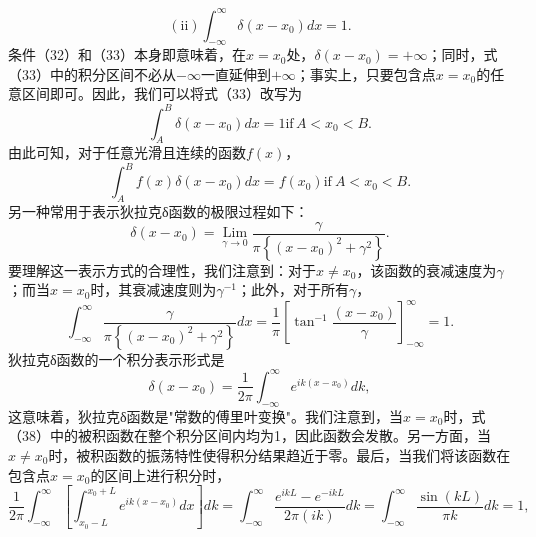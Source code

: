 \begin{equation}\tag{17.2.36}\label{eq:17.2.36}
( \mathrm { i i } )  \int _ { - \infty } ^{\infty} \delta ( x - x _ { 0 } ) d x = 1 .
\end{equation}
条件（32）和（33）本身即意味着，在\(x = x_0\)处，\(\delta(x - x_0) = +\infty\)；同时，式（33）中的积分区间不必从\(-\infty\)一直延伸到\(+\infty\)；事实上，只要包含点\(x = x_0\)的任意区间即可。因此，我们可以将式（33）改写为
\begin{equation}\tag{17.2.37}\label{eq:17.2.37}
\int _ { A } ^{B} \delta ( x - x _ { 0 } ) d x = 1  \mathrm { i f } \, A < x _ { 0 } < B .
\end{equation}
由此可知，对于任意光滑且连续的函数\(f(x)\)，
\begin{equation}\tag{17.2.38}\label{eq:17.2.38}
\int _ { A } ^{B} f ( x ) \delta ( x - x _ { 0 } ) d x = f ( x _ { 0 } )  { \mathrm { i f ~ } } A < x _ { 0 } < B .
\end{equation}
另一种常用于表示狄拉克δ函数的极限过程如下：
\begin{equation}\tag{17.2.39}\label{eq:17.2.39}
\delta ( x - x _ { 0 } ) = \operatorname* { L i m } _ { \gamma \to 0 } \frac { \gamma } { \pi \left\{ ( x - x _ { 0 } ) ^{2} + \gamma ^{2} \right\} } .
\end{equation}
要理解这一表示方式的合理性，我们注意到：对于\(x \neq x_0\)，该函数的衰减速度为\(\gamma\)；而当\(x = x_0\)时，其衰减速度则为\(\gamma^{-1}\)；此外，对于所有\(\gamma\)，
\begin{equation}\tag{17.2.40}\label{eq:17.2.40}
\int _ { - \infty } ^{\infty} \frac { \gamma } { \pi \left\{ ( x - x _ { 0 } ) ^{2} + \gamma ^{2} \right\} } d x = \frac { 1 } { \pi } \left[ \tan ^{- 1} \frac { ( x - x _ { 0 } ) } { \gamma } \right] _ { - \infty } ^{\infty} = 1 .
\end{equation}
狄拉克δ函数的一个积分表示形式是
\begin{equation}\tag{17.2.41}\label{eq:17.2.41}
\delta ( x - x _ { 0 } ) = \frac { 1 } { 2 \pi } \int _ { - \infty } ^{\infty} e ^{i k ( x - x _ { 0} ) } d k ,
\end{equation}
这意味着，狄拉克δ函数是"常数的傅里叶变换"。我们注意到，当\(x = x_{0}\)时，式（38）中的被积函数在整个积分区间内均为1，因此函数会发散。另一方面，当\(x \neq x_{0}\)时，被积函数的振荡特性使得积分结果趋近于零。最后，当我们将该函数在包含点\(x = x_{0}\)的区间上进行积分时，
\begin{equation}\tag{17.2.42}\label{eq:17.2.42}
\frac { 1 } { 2 \pi } \int _ { - \infty } ^{\infty} \left[ \int _ { x _ { 0 } - L } ^{x _ { 0} + L } e ^{i k ( x - x _ { 0} ) } d x \right] d k = \int _ { - \infty } ^{\infty} \frac { e ^{i k L} - e ^{- i k L} } { 2 \pi ( i k ) } d k = \int _ { - \infty } ^{\infty} \frac { \sin ( k L ) } { \pi k } d k = 1 ,
\end{equation}
